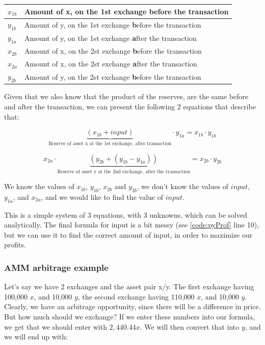 \begin{table}[h]
\centering
\begin{tabular}{|l|l|}
\hline
$x_{1b}$ & Amount of x, on the 1st exchange \textbf{b}efore the transaction \\
\hline
$y_{1b}$ & Amount of y, on the 1st exchange \textbf{b}efore the transaction \\
\hline
$y_{1a}$ & Amount of y, on the 1st exchange \textbf{a}fter the transaction \\
\hline
$x_{2b}$ & Amount of x, on the 2st exchange \textbf{b}efore the transaction \\
\hline
$x_{2a}$ & Amount of x, on the 2st exchange \textbf{a}fter the transaction \\
\hline
$y_{2b}$ & Amount of y, on the 2st exchange \textbf{b}efore the transaction \\
\hline
\end{tabular}
\end{table}

Given that we also know that the product of the reserves, are the same before and
after the transaction, we can present the following 2 equations that describe
that:

\begin{equation}
\underbrace{(x_{1b} + input)}_{\text{Reserve of asset x at the 1st exchange, after transaction}} \cdot y_{1a} = x_{1b} \cdot y_{1b}
\end{equation}

\begin{equation}
x_{2a} \cdot \underbrace{(y_{2b} + (y_{1b} - y_{1a}))}_{\text{Reserve of asset y at
the 2nd exchange, after the transaction}} = x_{2b} \cdot y_{2b}
\end{equation}

We know the values of $x_{1b}$, $y_{1b}$, $x_{2b}$ and $y_{2b}$, we don't know
the values of $input$, $y_{1a}$, and $x_{2a}$, and we would like to find the
value of $input$.

This is a simple system of 3 equations, with 3 unknowns, which can be solved
analytically. The final formula for input is a bit messy (see \ref{code:pyProf}
line 10), but we can use it to find the correct amount of input, in order to
maximize our profits.

\subsubsection{AMM arbitrage example}
Let's say we have 2 exchanges and the asset pair x/y. The first exchange having
100,000 $x$, and 10,000 $y$, the second exchange having 110,000 $x$, and 10,000 $y$.
Clearly, we have an arbitrage opportunity, since there will be a difference in
price. But how much should we exchange? If we enter these numbers into our
formula, we get that we should enter with $2,440.44 x$. We will then convert that
into $y$, and we will end up with:

